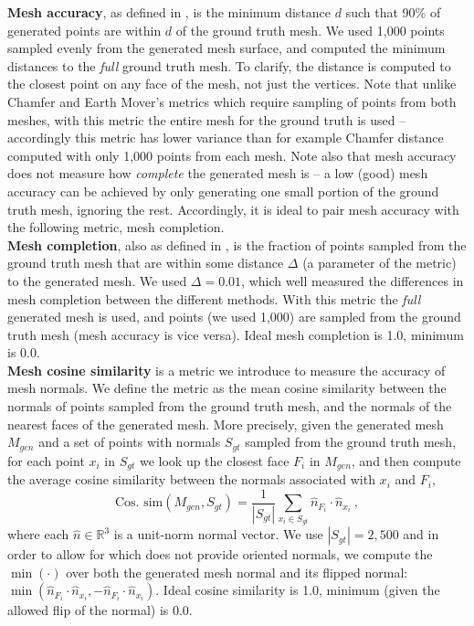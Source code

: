 \documentclass[10pt,twocolumn,letterpaper]{article}
\DeclareMathOperator*{\argmin}{arg\,min}
\begin{document}
   
\textbf{Mesh accuracy}, as defined in \cite{seitz2006comparison}, is the minimum distance $d$ such that 90\% of generated points are within $d$ of the ground truth mesh.  We used 1,000 points sampled evenly from the generated mesh surface, and computed the minimum distances to the \textit{full} ground truth mesh. To clarify, the distance is computed to the closest point on any face of the mesh, not just the vertices.  Note that unlike Chamfer and Earth Mover's metrics which require sampling of points from both meshes, with this metric the entire mesh for the ground truth is used -- accordingly this metric has lower variance than for example Chamfer distance computed with only 1,000 points from each mesh.  Note also that mesh accuracy does not measure how \textit{complete} the generated mesh is -- a low (good) mesh accuracy can be achieved by only generating one small portion of the ground truth mesh, ignoring the rest.  Accordingly, it is ideal to pair mesh accuracy with the following metric, mesh completion. \\

\textbf{Mesh completion}, also as defined in \cite{seitz2006comparison}, is the fraction of points sampled from the ground truth mesh that are within some distance $\Delta$ (a parameter of the metric) to the generated mesh.  We used $\Delta=0.01$, which well measured the differences in mesh completion between the different methods.  With this metric the {\em full} generated mesh is used, and points (we used 1,000) are sampled from the ground truth mesh (mesh accuracy is vice versa). Ideal mesh completion is 1.0, minimum is 0.0.\\

\textbf{Mesh cosine similarity} is a metric we introduce to measure the accuracy of mesh normals. We define the metric as the mean cosine similarity between the normals of points sampled from the ground truth mesh, and the normals of the nearest faces of the generated mesh. More precisely, given the generated mesh $M_{gen}$ and a set of points with normals $S_{gt}$ sampled from the ground truth mesh, for each point $x_i$ in $S_{gt}$ we look up the closest face $F_{i}$ in $M_{gen}$, and then compute the average cosine similarity between the normals associated with $x_i$ and $F_{i}$, 
%
$$ \text{Cos. sim}(M_{gen},S_{gt}) = \frac{1}{|S_{gt}|} \sum_{x_i \in S_{gt}} \hat{n}_{F_i} \cdot \hat{n}_{x_i} \ , $$ 
%
where %
each $\hat{n} \in \mathbb{R}^3$ is a unit-norm normal vector. We use $|S_{gt}|=2,500$ and in order to allow for \cite{groueix2018atlasnet} which does not provide oriented normals, we compute the $\min(\cdot)$ over both the generated mesh normal and its flipped normal: $\min(\hat{n}_{F_i} \cdot \hat{n}_{x_i}, -\hat{n}_{F_i} \cdot \hat{n}_{x_i} )$.  Ideal cosine similarity is 1.0, minimum (given the allowed flip of the normal) is 0.0.
\end{document}
